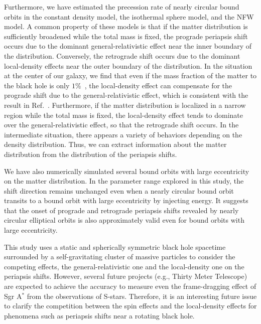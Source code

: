 \documentclass[aps,11pt,nofootinbib,preprintnumbers,groupedaddress,superscriptaddress]{revtex4-2}
\begin{document}
Furthermore, we have estimated 
the precession rate of nearly circular 
bound orbits in 
the constant density model, the isothermal sphere model, and the NFW model.
A common property of 
these models 
is that if the matter distribution is sufficiently broadened while 
the total mass 
is
fixed, the prograde 
periapsis shift occurs due to the dominant 
general-relativistic 
effect near the inner boundary of the distribution.
Conversely, the retrograde shift occurs due to the dominant 
local-density effects near the outer boundary of the distribution.
In the situation at the center of our galaxy, we find that even if the mass fraction of the matter to the black hole is only $1\%$~\cite{Heissel:2021pcw, GRAVITY:2021xju}, the 
local-density effect can compensate for the prograde shift due to the 
general-relativistic effect, which is consistent with the result in Ref.~\cite{Rubilar:2001}.
Furthermore,
if the matter distribution is localized in a narrow region while 
the total mass is fixed, the 
local-density effect tends to dominate over the 
general-relativistic 
effect, 
so that the retrograde shift occurs.
In the intermediate situation, 
there appears a variety of behaviors depending on the density distribution. 
Thus, 
we can extract information about the matter distribution from the distribution of the 
periapsis shifts. 


We have also numerically 
simulated 
several bound 
orbits with 
large eccentricity
on the matter distribution. In the parameter range explored in this study, 
the shift direction remains 
unchanged
even when 
a nearly circular
bound 
orbit transits to 
a bound 
orbit with 
large eccentricity
by injecting energy. It suggests that the onset of prograde and retrograde 
periapsis 
shifts revealed by nearly circular elliptical orbits is also 
approximately valid 
even for 
bound orbits with 
large eccentricity.


This study uses a static and spherically symmetric 
black hole spacetime 
surrounded by a self-gravitating cluster of massive particles 
to consider the competing effects, the 
general-relativistic 
one and the 
local-density 
one on the 
periapsis shifts.
However, 
several future projects (e.g., Thirty Meter Telescope) are expected to achieve the accuracy to measure even the frame-dragging effect of Sgr A$^\ast$ from the 
observations of S-stars.
Therefore, 
it is an interesting future issue to
clarify the competition between the spin effects and the local-density effects for phenomena such as periapsis shifts near a rotating black hole. 
\end{document}
